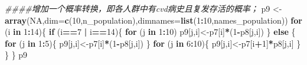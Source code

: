 \documentclass[
]{article}
\newenvironment{Shaded}{\begin{snugshade}}{\end{snugshade}}
\newcommand{\CommentTok}[1]{\textcolor[rgb]{0.56,0.35,0.01}{\textit{#1}}}
\newcommand{\ControlFlowTok}[1]{\textcolor[rgb]{0.13,0.29,0.53}{\textbf{#1}}}
\newcommand{\DataTypeTok}[1]{\textcolor[rgb]{0.13,0.29,0.53}{#1}}
\newcommand{\DecValTok}[1]{\textcolor[rgb]{0.00,0.00,0.81}{#1}}
\newcommand{\KeywordTok}[1]{\textcolor[rgb]{0.13,0.29,0.53}{\textbf{#1}}}
\newcommand{\NormalTok}[1]{#1}
\newcommand{\OperatorTok}[1]{\textcolor[rgb]{0.81,0.36,0.00}{\textbf{#1}}}
\newcommand{\OtherTok}[1]{\textcolor[rgb]{0.56,0.35,0.01}{#1}}
\newcommand{\StringTok}[1]{\textcolor[rgb]{0.31,0.60,0.02}{#1}}
\begin{document}
\begin{Shaded}
\begin{Highlighting}[]
\CommentTok{####增加一个概率转换，即各人群中有cvd病史且复发存活的概率；}
\NormalTok{p9 <-}\StringTok{ }\KeywordTok{array}\NormalTok{(}\OtherTok{NA}\NormalTok{,}\DataTypeTok{dim=}\KeywordTok{c}\NormalTok{(}\DecValTok{10}\NormalTok{,n_population),}\DataTypeTok{dimnames=}\KeywordTok{list}\NormalTok{(}\DecValTok{1}\OperatorTok{:}\DecValTok{10}\NormalTok{,names_population))}
\ControlFlowTok{for}\NormalTok{ (i }\ControlFlowTok{in} \DecValTok{1}\OperatorTok{:}\DecValTok{14}\NormalTok{)\{}
  \ControlFlowTok{if}\NormalTok{ (i}\OperatorTok{==}\DecValTok{7} \OperatorTok{|}\StringTok{ }\NormalTok{i}\OperatorTok{==}\DecValTok{14}\NormalTok{)\{}
    \ControlFlowTok{for}\NormalTok{ (j }\ControlFlowTok{in} \DecValTok{1}\OperatorTok{:}\DecValTok{10}\NormalTok{)}
\NormalTok{      p9[j,i]<-p7[i]}\OperatorTok{*}\NormalTok{(}\DecValTok{1}\OperatorTok{-}\NormalTok{p8[j,i])}
\NormalTok{  \}}
  \ControlFlowTok{else}\NormalTok{ \{}
    \ControlFlowTok{for}\NormalTok{ (j }\ControlFlowTok{in} \DecValTok{1}\OperatorTok{:}\DecValTok{5}\NormalTok{)\{}
\NormalTok{      p9[j,i]<-p7[i]}\OperatorTok{*}\NormalTok{(}\DecValTok{1}\OperatorTok{-}\NormalTok{p8[j,i])}
\NormalTok{    \}}
    \ControlFlowTok{for}\NormalTok{ (j }\ControlFlowTok{in} \DecValTok{6}\OperatorTok{:}\DecValTok{10}\NormalTok{)\{}
\NormalTok{      p9[j,i]<-p7[i}\OperatorTok{+}\DecValTok{1}\NormalTok{]}\OperatorTok{*}\NormalTok{p8[j,i]}
\NormalTok{    \}}
\NormalTok{  \}}
\NormalTok{\}}
\NormalTok{p9}
\end{Highlighting}
\end{Shaded}
\end{document}
